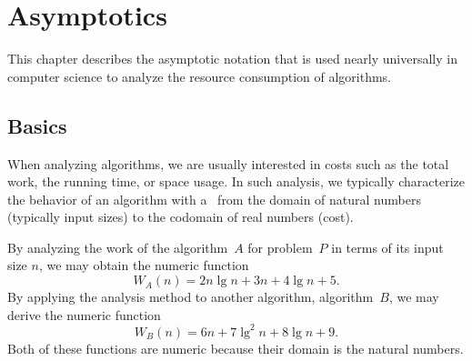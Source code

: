 \chapter{Asymptotics}
\label{ch:analysis::asymptotics}

\begin{cluster}
\label{grp:prmbl:analysis::asymptotics::describes}

\begin{preamble}
\label{prmbl:analysis::asymptotics::describes}
This chapter describes the asymptotic notation that is used nearly
universally in computer science to analyze the resource consumption of
algorithms.

\end{preamble}
\end{cluster}


\section{Basics}
\label{sec:analysis::asymptotics::asymptotics}

\begin{flex}
\label{grp:grm:analysis::asymptotics::analyzing}

\begin{gram}
\label{grm:analysis::asymptotics::analyzing}
When analyzing algorithms, we are usually interested in
costs such as the total work, the running time, or space usage. 
In such analysis, we typically characterize the behavior of an
algorithm with a~ from the domain of natural
numbers (typically input sizes) to the codomain of real numbers (cost).

\end{gram}

\begin{example}
\label{xmpl:analysis::asymptotics::numeric-functions}
By analyzing the work of the algorithm~$A$ for problem~$P$ in terms of
its input size $n$, we may obtain the numeric function
$$W_A(n) = 2n\lg{n} + 3n + 4\lg{n} + 5.$$  
By applying the analysis method to another algorithm, algorithm~$B$,
we may derive the numeric function
$$ W_B(n) = 6n + 7\lg^2{n} + 8\lg{n} + 9.$$
Both of these functions are numeric because their domain is the natural
numbers.

\end{example}
\end{flex}

